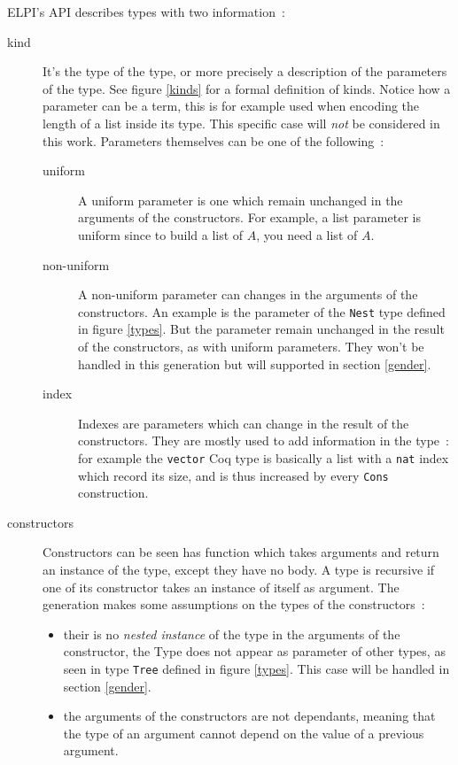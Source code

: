 \documentclass{article}
\begin{document}
ELPI's API describes types with two information~:\begin{description}
    \item[kind] It's the type of the type, or more precisely a description of
        the parameters of the type. See figure \ref{kinds} for a formal
        definition of kinds. Notice how a parameter can be a term, this is
        for example used when encoding the length of a list inside its type.
        This specific case will \emph{not} be considered in this work. Parameters
        themselves can be one of the following~:\begin{description}
            \item[uniform] A uniform parameter is one which remain unchanged
                in the arguments of the constructors. For example, a list parameter
                is uniform since to build a list of $A$, you need a list of $A$.
            \item[non-uniform] A non-uniform parameter can changes in the arguments
                of the constructors. An example is the parameter of the
                \texttt{Nest} type defined in figure \ref{types}. But the parameter
                remain unchanged in the result of the constructors, as with
                uniform parameters. They won't be handled in this generation
                but will supported in section \ref{gender}.
            \item[index] Indexes are parameters which can change in the result
                of the constructors. They are mostly used to add information
                in the type~: for example the \texttt{vector} Coq type is basically
                a list with a \texttt{nat} index which record its size, and is
                thus increased by every \texttt{Cons} construction.
        \end{description}
    \item[constructors] Constructors can be seen has function which takes arguments
        and return an instance of the type, except they have no body. A type is
        recursive if one of its constructor takes an instance of itself as
        argument. The generation makes some assumptions on the types of the
        constructors~:\begin{itemize}
            \item their is no \emph{nested instance} of the type in the arguments
                of the constructor, the Type does not appear as parameter of
                other types, as seen in type
                \texttt{Tree} defined in figure \ref{types}. This case will be
                handled in section \ref{gender}.
            \item the arguments of the constructors are not dependants, meaning
                that the type of an argument cannot depend on the value of
                a previous argument.
        \end{itemize}
\end{description}
\end{document}
